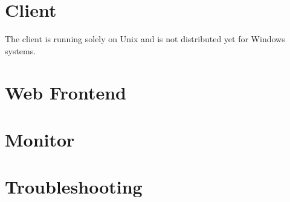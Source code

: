\documentclass[twoside,a4paper]{refart}
\theoremstyle{dotless}
\newcounter{ex}
\begin{document}
\newpage
\section{Client}
\label{client}

\clearpage

\attention The client is running solely on Unix and is not distributed yet for Windows systems.

\newpage
\section{Web Frontend}
\label{web_frontend}

\clearpage

\section{Monitor}

\section{Troubleshooting}



\begin{fullpage}
\printglossary
\end{fullpage}

\printindex
\end{document}
